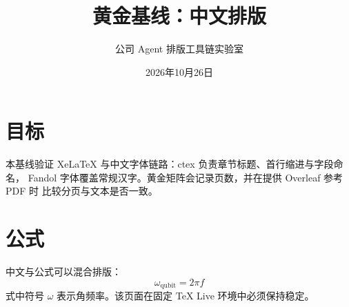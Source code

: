 \documentclass[UTF8]{ctexart}
\begin{document}
\title{黄金基线：中文排版}
\author{公司 Agent 排版工具链实验室}
\date{2026年10月26日}
\maketitle

\section{目标}
本基线验证 XeLaTeX 与中文字体链路：ctex 负责章节标题、首行缩进与字段命名，
Fandol 字体覆盖常规汉字。黄金矩阵会记录页数，并在提供 Overleaf 参考 PDF 时
比较分页与文本是否一致。

\section{公式}
中文与公式可以混合排版：
\begin{equation}
  \omega_{\mathrm{qubit}} = 2\pi f
\end{equation}
式中符号 $\omega$ 表示角频率。该页面在固定 TeX Live 环境中必须保持稳定。
\end{document}
